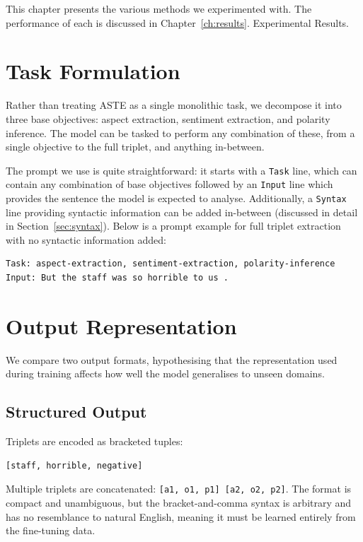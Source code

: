 \documentclass[12pt,a4paper]{report}
\begin{document}
This chapter presents the various methods we experimented with. The performance of each is discussed in Chapter~\ref{ch:results}. Experimental Results.

\section{Task Formulation}\label{sec:task-formulation}

Rather than treating ASTE as a single monolithic task, we decompose it into 
three base objectives: aspect extraction, sentiment extraction, and polarity 
inference. The model can be tasked to perform any combination of these, 
from a single objective to the full triplet, and anything in-between.

The prompt we use is quite straightforward: it starts with a \texttt{Task} line, 
which can contain any combination of base objectives followed by an \texttt{Input} line which
provides the sentence the model is expected to analyse. 
Additionally, a \texttt{Syntax} line providing syntactic information can be added in-between (discussed in detail in Section~\ref{sec:syntax}).
Below is a prompt example for full triplet extraction with no syntactic information added:

\begin{lstlisting}
Task: aspect-extraction, sentiment-extraction, polarity-inference
Input: But the staff was so horrible to us .
\end{lstlisting}

\section{Output Representation}\label{sec:output-format}

We compare two output formats, hypothesising that the representation used during training affects how well the model generalises to unseen domains.

\subsection{Structured Output}

Triplets are encoded as bracketed tuples:

\begin{lstlisting}
[staff, horrible, negative]
\end{lstlisting}

Multiple triplets are concatenated: \texttt{[a1, o1, p1] [a2, o2, p2]}. The format is compact and unambiguous, but the bracket-and-comma syntax is arbitrary and has no resemblance to natural English, meaning it must be learned entirely from the fine-tuning data.
\end{document}
